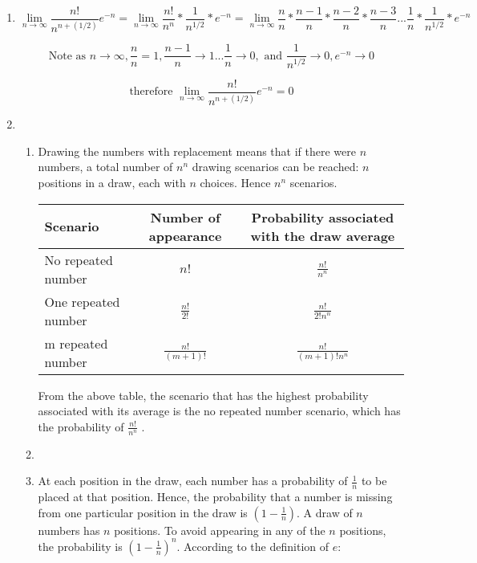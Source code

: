 \documentclass[11pt,letterpaper,titlepage]{article}
\begin{document}
\begin{enumerate}
    \item $$ \lim_{n\to\infty} \frac{n!}{n^{n+(1/2)}}e^{-n} = \lim_{n\to\infty} \frac{n!}{n^{n}} * \frac{1}{n^{1/2}} * e^{-n} = \lim_{n\to\infty} \frac{n}{n} * \frac{n-1}{n} * \frac{n-2}{n} * \frac{n-3}{n} ... \frac{1}{n} * \frac{1}{n^{1/2}} * e^{-n} $$

    $$ \text{Note as } {n\to\infty}, \frac{n}{n} = 1, \frac{n-1}{n}\to 1...\frac{1}{n}\to 0, \text{ and } \frac{1}{n^{1/2}} \to 0, e^{-n} \to 0 $$
    
    $$ \text{therefore } \lim_{n\to\infty} \frac{n!}{n^{n+(1/2)}}e^{-n} = 0 $$
    
    \item \begin{enumerate}
        \item Drawing the numbers with replacement means that if there were $ n $ numbers, a total number of $ n^n $ drawing scenarios can be reached: $ n $ positions in a draw, each with $ n $ choices. Hence $ n^n $ scenarios.
        
        \begin{table}[ht]
        \centering
        \begin{tabular}{@{}lcc@{}}
        \toprule
        Scenario & Number of appearance & Probability associated with the draw average \\ \midrule
        No repeated number         &    $ n! $                   &   $ \frac{n!}{n^n} $                                           \\ \midrule
        One repeated number         &      $ \frac{n!}{2!} $                 &              $ \frac{n!}{2!n^n} $                                \\ \midrule
        m repeated number         &     $ \frac{n!}{(m+1)!} $                 &           $ \frac{n!}{(m+1)!n^n} $                                       \\ \bottomrule
        \end{tabular}
        \end{table}
        
        From the above table, the scenario that has the highest probability associated with its average is the no repeated number scenario, which has the probability of $ \frac{n!}{n^n} $ .
        
        \item
        
        \item At each position in the draw, each number has a probability of $ 
        \frac{1}{n} $ to be placed at that position. Hence, the probability that a number is missing from one particular position in the draw is $ (1-\frac{1}{n}) $. A draw of $ n $ numbers has $ n $ positions. To avoid appearing in any of the $ n $ positions, the probability is $ (1-\frac{1}{n})^n $. According to the definition of $ e $:
        

\end{enumerate}
\end{enumerate}
\end{document}

